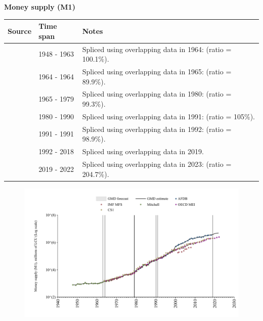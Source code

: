 \documentclass[12pt,a4paper,landscape]{article}
\begin{document}
\begin{adjustbox}{max totalsize={\paperwidth}{\paperheight},center}
\begin{minipage}[t][\textheight][t]{\textwidth}
\vspace*{0.5cm}
{}
\begin{center}
{\Large\bfseries Money supply (M1)}
\end{center}
\vspace{0.5cm}
\begin{table}[H]
\centering
\small
\begin{tabular}{|l|l|l|}
\hline
\textbf{Source} & \textbf{Time span} & \textbf{Notes} \\
\hline
\rowcolor{white}\cite{Mitchell}& 1948 - 1963 &Spliced using overlapping data in 1964: (ratio = 100.1\%). \\
\rowcolor{lightgray}\cite{CS1_ZAF}& 1964 - 1964 &Spliced using overlapping data in 1965: (ratio = 89.9\%). \\
\rowcolor{white}\cite{OECD_MEI}& 1965 - 1979 &Spliced using overlapping data in 1980: (ratio = 99.3\%). \\
\rowcolor{lightgray}\cite{AFDB}& 1980 - 1990 &Spliced using overlapping data in 1991: (ratio = 105\%). \\
\rowcolor{white}\cite{OECD_MEI}& 1991 - 1991 &Spliced using overlapping data in 1992: (ratio = 98.9\%). \\
\rowcolor{lightgray}\cite{AFDB}& 1992 - 2018 &Spliced using overlapping data in 2019. \\
\rowcolor{white}\cite{OECD_MEI}& 2019 - 2022 &Spliced using overlapping data in 2023: (ratio = 204.7\%). \\
\hline
\end{tabular}
\end{table}
\begin{figure}[H]
\centering
\includegraphics[width=\textwidth,height=0.6\textheight,keepaspectratio]{graphs/ZAF_M1.pdf}
\end{figure}
\end{minipage}
\end{adjustbox}
\end{document}
